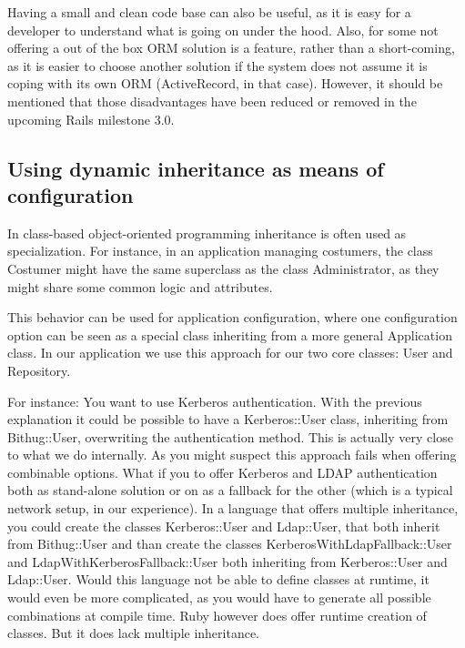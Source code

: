 \documentclass{llncs}
\begin{document}
Having a small and clean code base can also be useful, as it is easy for a developer to understand what is going on under the hood.
Also, for some not offering a out of the box ORM solution is a feature, rather than a short-coming, as it is easier to
choose another solution if the system does not assume it is coping with its own ORM (ActiveRecord, in that case). However,
it should be mentioned that those disadvantages have been reduced or removed in the upcoming Rails milestone 3.0.

\subsection{Using dynamic inheritance as means of configuration}
In class-based object-oriented programming inheritance is often used as specialization.
For instance, in an application managing costumers, the class Costumer might have the same
superclass as the class Administrator, as they might share some common logic and attributes.

This behavior can be used for application configuration, where one configuration option can be seen
as a special class inheriting from a more general Application class. In our application we use this
approach for our two core classes: User and Repository.

For instance: You want to use Kerberos authentication. With the previous explanation it could be possible
to have a Kerberos::User class, inheriting from Bithug::User, overwriting the authentication method.
This is actually very close to what we do internally. As you might suspect this approach fails when offering
combinable options. What if you to offer Kerberos and LDAP authentication both as stand-alone solution or
on as a fallback for the other (which is a typical network setup, in our experience). In a language that offers
multiple inheritance, you could create the classes Kerberos::User and Ldap::User, that both inherit from Bithug::User
and than create the classes KerberosWithLdapFallback::User and LdapWithKerberosFallback::User both inheriting
from Kerberos::User and Ldap::User. Would this language not be able to define classes at runtime, it would even be
more complicated, as you would have to generate all possible combinations at compile time. Ruby however does offer
runtime creation of classes. But it does lack multiple inheritance.
\end{document}
